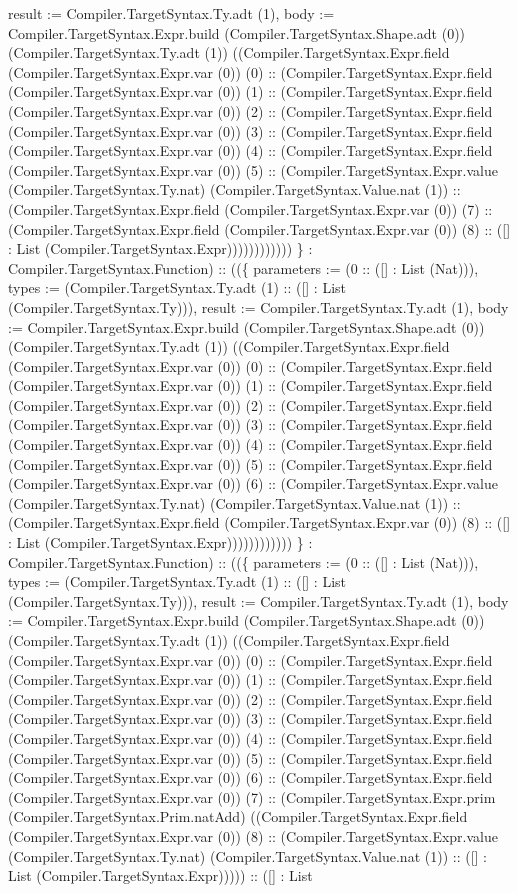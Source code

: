 \documentclass[11pt]{article}
\begin{document}
result := Compiler.TargetSyntax.Ty.adt (1), body := Compiler.TargetSyntax.Expr.build (Compiler.TargetSyntax.Shape.adt (0)) (Compiler.TargetSyntax.Ty.adt (1)) ((Compiler.TargetSyntax.Expr.field (Compiler.TargetSyntax.Expr.var (0)) (0) :: (Compiler.TargetSyntax.Expr.field (Compiler.TargetSyntax.Expr.var (0)) (1) :: (Compiler.TargetSyntax.Expr.field (Compiler.TargetSyntax.Expr.var (0)) (2) :: (Compiler.TargetSyntax.Expr.field (Compiler.TargetSyntax.Expr.var (0)) (3) :: (Compiler.TargetSyntax.Expr.field (Compiler.TargetSyntax.Expr.var (0)) (4) :: (Compiler.TargetSyntax.Expr.field (Compiler.TargetSyntax.Expr.var (0)) (5) :: (Compiler.TargetSyntax.Expr.value (Compiler.TargetSyntax.Ty.nat) (Compiler.TargetSyntax.Value.nat (1)) :: (Compiler.TargetSyntax.Expr.field (Compiler.TargetSyntax.Expr.var (0)) (7) :: (Compiler.TargetSyntax.Expr.field (Compiler.TargetSyntax.Expr.var (0)) (8) :: ([] : List (Compiler.TargetSyntax.Expr)))))))))))) \} : Compiler.TargetSyntax.Function) :: ((\{ parameters := (0 :: ([] : List (Nat))), types := (Compiler.TargetSyntax.Ty.adt (1) :: ([] : List (Compiler.TargetSyntax.Ty))), result := Compiler.TargetSyntax.Ty.adt (1), body := Compiler.TargetSyntax.Expr.build (Compiler.TargetSyntax.Shape.adt (0)) (Compiler.TargetSyntax.Ty.adt (1)) ((Compiler.TargetSyntax.Expr.field (Compiler.TargetSyntax.Expr.var (0)) (0) :: (Compiler.TargetSyntax.Expr.field (Compiler.TargetSyntax.Expr.var (0)) (1) :: (Compiler.TargetSyntax.Expr.field (Compiler.TargetSyntax.Expr.var (0)) (2) :: (Compiler.TargetSyntax.Expr.field (Compiler.TargetSyntax.Expr.var (0)) (3) :: (Compiler.TargetSyntax.Expr.field (Compiler.TargetSyntax.Expr.var (0)) (4) :: (Compiler.TargetSyntax.Expr.field (Compiler.TargetSyntax.Expr.var (0)) (5) :: (Compiler.TargetSyntax.Expr.field (Compiler.TargetSyntax.Expr.var (0)) (6) :: (Compiler.TargetSyntax.Expr.value (Compiler.TargetSyntax.Ty.nat) (Compiler.TargetSyntax.Value.nat (1)) :: (Compiler.TargetSyntax.Expr.field (Compiler.TargetSyntax.Expr.var (0)) (8) :: ([] : List (Compiler.TargetSyntax.Expr)))))))))))) \} : Compiler.TargetSyntax.Function) :: ((\{ parameters := (0 :: ([] : List (Nat))), types := (Compiler.TargetSyntax.Ty.adt (1) :: ([] : List (Compiler.TargetSyntax.Ty))), result := Compiler.TargetSyntax.Ty.adt (1), body := Compiler.TargetSyntax.Expr.build (Compiler.TargetSyntax.Shape.adt (0)) (Compiler.TargetSyntax.Ty.adt (1)) ((Compiler.TargetSyntax.Expr.field (Compiler.TargetSyntax.Expr.var (0)) (0) :: (Compiler.TargetSyntax.Expr.field (Compiler.TargetSyntax.Expr.var (0)) (1) :: (Compiler.TargetSyntax.Expr.field (Compiler.TargetSyntax.Expr.var (0)) (2) :: (Compiler.TargetSyntax.Expr.field (Compiler.TargetSyntax.Expr.var (0)) (3) :: (Compiler.TargetSyntax.Expr.field (Compiler.TargetSyntax.Expr.var (0)) (4) :: (Compiler.TargetSyntax.Expr.field (Compiler.TargetSyntax.Expr.var (0)) (5) :: (Compiler.TargetSyntax.Expr.field (Compiler.TargetSyntax.Expr.var (0)) (6) :: (Compiler.TargetSyntax.Expr.field (Compiler.TargetSyntax.Expr.var (0)) (7) :: (Compiler.TargetSyntax.Expr.prim (Compiler.TargetSyntax.Prim.natAdd) ((Compiler.TargetSyntax.Expr.field (Compiler.TargetSyntax.Expr.var (0)) (8) :: (Compiler.TargetSyntax.Expr.value (Compiler.TargetSyntax.Ty.nat) (Compiler.TargetSyntax.Value.nat (1)) :: ([] : List (Compiler.TargetSyntax.Expr))))) :: ([] : List 
\end{document}
